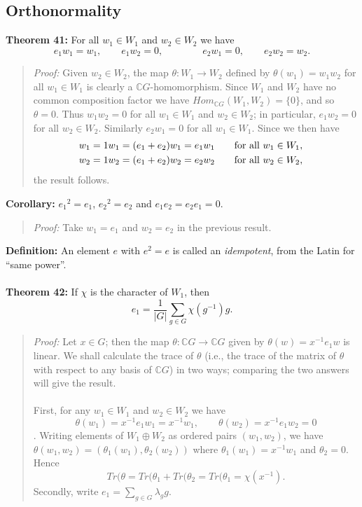 {\subsection{Orthonormality}
{\bf Theorem 41:} For all $w_1\in W_1$ and
$w_2\in W_2$ we have
$$e_1w_1=w_1,\qquad e_1w_2=0,\qquad\qquad e_2w_1=0,\qquad
e_2w_2=w_2.$$
\begin{quote}
\emph{Proof:}
Given $w_2\in W_2$, the map $\theta:W_1\rightarrow W_2$ defined by
$\theta(w_1)=w_1w_2$ for all $w_1\in W_1$ is clearly a ${\mathbb C}G$-homomorphism. 
Since $W_1$ and $W_2$ have no common composition factor we
have $ Hom_{{\mathbb C}G}(W_1,W_2)=\{0\}$, and so $\theta=0$. Thus $w_1w_2=0$ for all
$w_1\in W_1$ and $w_2\in W_2$; in particular, $e_1w_2=0$ for all $w_2\in W_2$.
Similarly $e_2w_1=0$ for all $w_1\in W_1$. Since we then have
\begin{eqnarray*}
&w_1=1w_1=(e_1+e_2)w_1=e_1w_1\qquad\hbox{for all }w_1\in W_1,&\\
&w_2=1w_2=(e_1+e_2)w_2=e_2w_2\qquad\hbox{for all }w_2\in W_2,&
\end{eqnarray*}
the result follows.
\end{quote}
{\bf Corollary:} ${e_1}^2=e_1$, ${e_2}^2=e_2$ and
$e_1e_2=e_2e_1=0$.
\begin{quote}
\emph{Proof:}
Take $w_1=e_1$ and $w_2=e_2$ in the previous result.
\end{quote}
{\bf Definition:}
An element $e$ with $e^2=e$ is called an \emph{idempotent},
from the Latin for ``same power''.
\\
\\
{\bf Theorem 42:} If $\chi$ is the character of $W_1$, then
$$e_1=\frac{1}{|G|}\sum_{g\in G}\chi(g^{-1})g.$$
\begin{quote}
\emph{Proof:}
Let $x \in G$; then the map $\theta: {\mathbb C}G \rightarrow {\mathbb C}G$ given by
$\theta(w)=x^{-1}e_1w$ is linear. We shall calculate the trace of
$\theta$ (i.e., the trace of the matrix of $\theta$ with respect to
any basis of ${\mathbb C}G$) in two ways; comparing the two answers will give the
result.
\\
\\
First, for any $w_1\in W_1$ and $w_2\in W_2$ we have
$$\theta(w_1)=x^{-1}e_1w_1=x^{-1}w_1,\qquad\theta(w_2)=x^{-1}e_1w_2=0$$.
Writing elements of $W_1\oplus W_2$ as
ordered pairs $(w_1,w_2)$, we have
$\theta(w_1,w_2)=(\theta_1(w_1),\theta_2(w_2))$ where
$\theta_1(w_1)=x^{-1}w_1$ and $\theta_2=0$. Hence
$$Tr(\theta=Tr(\theta_1+Tr(\theta_2=Tr(\theta_1=\chi(x^{-1}).$$
Secondly, write $e_1=\sum_{g\in G}\lambda_gg$. 

\end{quote}}
